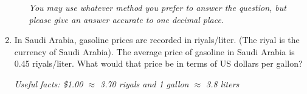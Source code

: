 \documentclass[12pt]{article}
\begin{document}
\begin{enumerate}
\begin{enumerate}
\emph{You may use whatever method you prefer to answer the question, but please give an answer accurate to one decimal place.}
\vfill

\end{enumerate}

\noindent \hrulefill
\item In Saudi Arabia, gasoline prices are recorded in riyals/liter.  (The riyal is the currency of Saudi Arabia).  The average price of gasoline in Saudi Arabia is 0.45 riyals/liter.  What would that price be in terms of US dollars per gallon?

\emph{Useful facts:  \$1.00 $\approx$ 3.70 riyals and 1 gallon $\approx$ 3.8 liters }
\vfill


\end{enumerate}




\newpage
\end{document}
